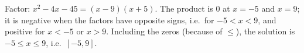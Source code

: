 Factor: $x^2-4x-45=(x-9)(x+5)$. The product is $0$ at $x=-5$ and $x=9$; it is negative when the factors have opposite signs, i.e.\ for $-5<x<9$, and positive for $x<-5$ or $x>9$. Including the zeros (because of $\le$), the solution is $\boxed{-5\le x\le9}$, i.e.\ $[-5,9]$.
